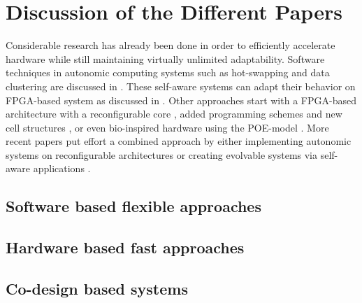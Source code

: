 
\section{Discussion of the Different Papers}
\label{sec:discussion}
Considerable research has already been done in order to efficiently accelerate hardware while still maintaining virtually unlimited adaptability. 
Software techniques in autonomic computing systems such as hot-swapping and data clustering are discussed in \cite{survey}. 
These self-aware systems can adapt their behavior on FPGA-based system as discussed in \cite{selfaware}.
Other approaches start with a FPGA-based architecture with a reconfigurable core \cite{drp},  added programming schemes and new cell structures \cite{virtex4}, \cite{erlangen} or even bio-inspired hardware using the POE-model \cite{poe}.
More recent papers put effort a combined approach by either implementing autonomic systems on reconfigurable architectures \cite{reconfigurable} or creating evolvable systems via self-aware applications \cite{evolvable}.

\subsection{Software based flexible approaches}
\label{sec:software}



\subsection{Hardware based fast approaches}
\label{sec:hardware}


\subsection{Co-design based systems}
\label{sec:codesign}



